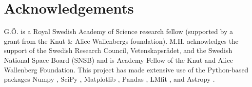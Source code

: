 \documentclass[twocolumn]{aastex61}
\begin{document}
\section*{Acknowledgements}\label{acknowledgements}

G.Ö. is a Royal Swedish Academy of Science research fellow (supported by
a grant from the Knut \& Alice Wallenbergs foundation). M.H.
acknowledges the support of the Swedish Research Council,
Vetenskapsrådet, and the Swedish National Space Board (SNSB) and is
Academy Fellow of the Knut and Alice Wallenberg Foundation. This project
has made extensive use of the Python-based packages Numpy \citep{Numpy},
SciPy \citep{SciPy}, Matplotlib \citep{Matplotlib}, Pandas
\citep{Pandas}, LMfit \citep{lmfit2014}, and Astropy
\citep{Astropy2013}.


\end{document}
